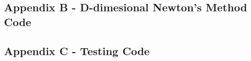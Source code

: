 \documentclass[10pt]{article}
\begin{document}
\subsection*{Appendix B - D-dimesional Newton's Method Code}


\pagebreak

\subsection*{Appendix C - Testing Code}

\end{document}
